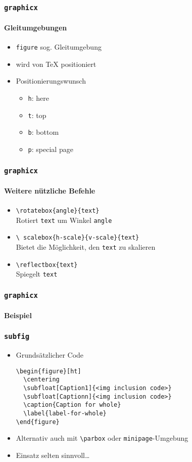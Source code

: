 \begin{frame}
  \frametitle{\texttt{graphicx}}
  \framesubtitle{Gleitumgebungen}
  \begin{itemize}
  \item \texttt{figure} sog. Gleitumgebung
  \item wird von \TeX{} positioniert
  \item Positionierungswunsch
    \begin{itemize}
    \item \texttt{h}: here
    \item \texttt{t}: top
    \item \texttt{b}: bottom
    \item \texttt{p}: special page
    \end{itemize}
  \end{itemize}
\end{frame}

\begin{frame}
  \frametitle{\texttt{graphicx}}
  \framesubtitle{Weitere nützliche Befehle}
  \begin{itemize}
  \item \texttt{\textbackslash rotatebox\{angle\}\{text\}}\\
    Rotiert \texttt{text} um Winkel \texttt{angle}
  \item \texttt{\textbackslash
      scalebox\{h-scale\}\{v-scale\}\{text\}}\\
    Bietet die Möglichkeit, den \texttt{text} zu skalieren
  \item \texttt{\textbackslash reflectbox\{text\}}\\
    Spiegelt \texttt{text}
  \end{itemize}
\end{frame}

\begin{frame}
  \frametitle{\texttt{graphicx}}
  \framesubtitle{Beispiel}
\end{frame}

\begin{frame}[fragile]
  \frametitle{\texttt{subfig}}
  \begin{itemize}
  \item Grundsätzlicher Code
\begin{lstlisting}[language={[LaTeX]TeX}]
\begin{figure}[ht]
  \centering
  \subfloat[Caption1]{<img inclusion code>}
  \subfloat[Captionn]{<img inclusion code>}
  \caption{Caption for whole}
  \label{label-for-whole}
\end{figure}
\end{lstlisting}
  \item Alternativ auch mit \texttt{\textbackslash parbox} oder
    \texttt{minipage}-Umgebung
  \item Einsatz selten sinnvoll\dots
  \end{itemize}
\end{frame}


